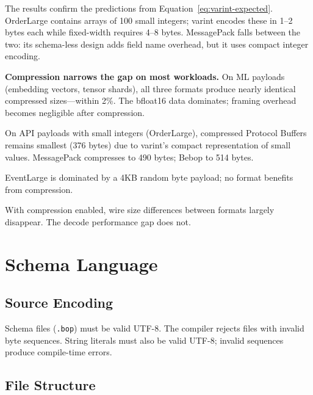 \documentclass[10pt,onecolumn]{article}
\begin{document}
The results confirm the predictions from Equation~\ref{eq:varint-expected}. OrderLarge contains arrays of 100 small integers; varint encodes these in 1--2 bytes each while fixed-width requires 4--8 bytes. MessagePack falls between the two: its schema-less design adds field name overhead, but it uses compact integer encoding.

\textbf{Compression narrows the gap on most workloads.} On ML payloads (embedding vectors, tensor shards), all three formats produce nearly identical compressed sizes---within 2\%. The bfloat16 data dominates; framing overhead becomes negligible after compression.

On API payloads with small integers (OrderLarge), compressed Protocol Buffers remains smallest (376 bytes) due to varint's compact representation of small values. MessagePack compresses to 490 bytes; Bebop to 514 bytes.

EventLarge is dominated by a 4KB random byte payload; no format benefits from compression.

With compression enabled, wire size differences between formats largely disappear. The decode performance gap does not.


\newpage
\section{Schema Language}

\subsection{Source Encoding}

Schema files (\texttt{.bop}) must be valid UTF-8. The compiler rejects files with invalid byte sequences. String literals must also be valid UTF-8; invalid sequences produce compile-time errors.

\subsection{File Structure}
\end{document}
